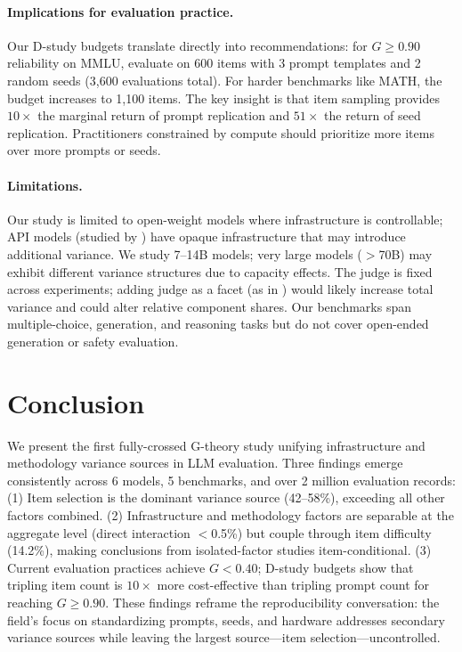 \documentclass[letterpaper,11pt]{article}
\begin{document}
\paragraph{Implications for evaluation practice.}
Our D-study budgets translate directly into recommendations: for $G \geq 0.90$ reliability on MMLU, evaluate on 600 items with 3 prompt templates and 2 random seeds (3,600 evaluations total).
For harder benchmarks like MATH, the budget increases to 1,100 items.
The key insight is that item sampling provides $10\times$ the marginal return of prompt replication and $51\times$ the return of seed replication.
Practitioners constrained by compute should prioritize more items over more prompts or seeds.

\paragraph{Limitations.}
Our study is limited to open-weight models where infrastructure is controllable; API models (studied by \citealt{mesting2026}) have opaque infrastructure that may introduce additional variance.
We study 7--14B models; very large models ($>$70B) may exhibit different variance structures due to capacity effects.
The judge is fixed across experiments; adding judge as a facet (as in \citealt{mesting2026}) would likely increase total variance and could alter relative component shares.
Our benchmarks span multiple-choice, generation, and reasoning tasks but do not cover open-ended generation or safety evaluation.

\section{Conclusion}

We present the first fully-crossed G-theory study unifying infrastructure and methodology variance sources in LLM evaluation.
Three findings emerge consistently across 6 models, 5 benchmarks, and over 2 million evaluation records:
(1) Item selection is the dominant variance source (42--58\%), exceeding all other factors combined.
(2) Infrastructure and methodology factors are separable at the aggregate level (direct interaction $<$0.5\%) but couple through item difficulty (14.2\%), making conclusions from isolated-factor studies item-conditional.
(3) Current evaluation practices achieve $G < 0.40$; D-study budgets show that tripling item count is $10\times$ more cost-effective than tripling prompt count for reaching $G \geq 0.90$.
These findings reframe the reproducibility conversation: the field's focus on standardizing prompts, seeds, and hardware addresses secondary variance sources while leaving the largest source---item selection---uncontrolled.
\end{document}
